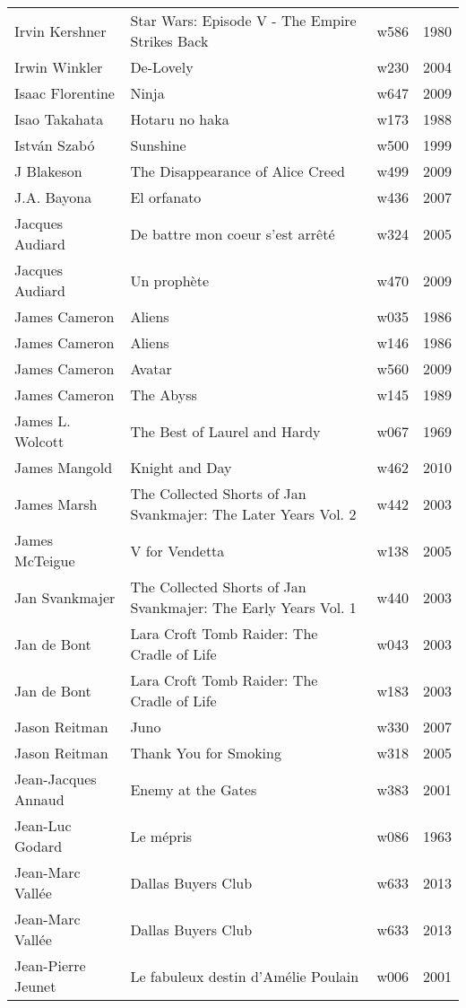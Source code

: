\documentclass{article}
\begin{document}
\begin {center}
\begin{longtable}{l p{10cm} l l}
Irvin Kershner & Star Wars: Episode V - The Empire Strikes Back & w586 & 1980 \\
Irwin Winkler & De-Lovely & w230 & 2004 \\
Isaac Florentine & Ninja & w647 & 2009 \\
Isao Takahata & Hotaru no haka & w173 & 1988 \\
István Szabó & Sunshine & w500 & 1999 \\
J Blakeson & The Disappearance of Alice Creed & w499 & 2009 \\
J.A. Bayona & El orfanato & w436 & 2007 \\
Jacques Audiard & De battre mon coeur s'est arrêté & w324 & 2005 \\
Jacques Audiard & Un prophète & w470 & 2009 \\
James Cameron & Aliens & w035 & 1986 \\
James Cameron & Aliens & w146 & 1986 \\
James Cameron & Avatar & w560 & 2009 \\
James Cameron & The Abyss & w145 & 1989 \\
James L. Wolcott & The Best of Laurel and Hardy & w067 & 1969 \\
James Mangold & Knight and Day & w462 & 2010 \\
James Marsh & The Collected Shorts of Jan Svankmajer: The Later Years Vol. 2 & w442 & 2003 \\
James McTeigue & V for Vendetta & w138 & 2005 \\
Jan Svankmajer & The Collected Shorts of Jan Svankmajer: The Early Years Vol. 1 & w440 & 2003 \\
Jan de Bont & Lara Croft Tomb Raider: The Cradle of Life & w043 & 2003 \\
Jan de Bont & Lara Croft Tomb Raider: The Cradle of Life & w183 & 2003 \\
Jason Reitman & Juno & w330 & 2007 \\
Jason Reitman & Thank You for Smoking & w318 & 2005 \\
Jean-Jacques Annaud & Enemy at the Gates & w383 & 2001 \\
Jean-Luc Godard & Le mépris & w086 & 1963 \\
Jean-Marc Vallée & Dallas Buyers Club & w633 & 2013 \\
Jean-Marc Vallée & Dallas Buyers Club & w633 & 2013 \\
Jean-Pierre Jeunet & Le fabuleux destin d'Amélie Poulain & w006 & 2001 \\

\end{longtable}
\end{center}
\end{document}
